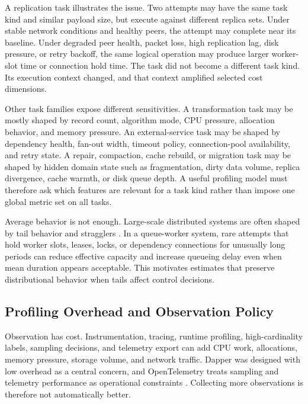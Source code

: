 A replication task illustrates the issue. Two attempts may have the same task
kind and similar payload size, but execute against different replica sets. Under
stable network conditions and healthy peers, the attempt may complete near its
baseline. Under degraded peer health, packet loss, high replication lag, disk
pressure, or retry backoff, the same logical operation may produce larger
worker-slot time or connection hold time. The task did not become a different
task kind. Its execution context changed, and that context amplified selected
cost dimensions.

Other task families expose different sensitivities. A transformation task may be
mostly shaped by record count, algorithm mode, CPU pressure, allocation behavior,
and memory pressure. An external-service task may be shaped by dependency
health, fan-out width, timeout policy, connection-pool availability, and retry
state. A repair, compaction, cache rebuild, or migration task may be shaped by
hidden domain state such as fragmentation, dirty data volume, replica divergence,
cache warmth, or disk queue depth. A useful profiling model must therefore ask
which features are relevant for a task kind rather than impose one global metric
set on all tasks.

Average behavior is not enough. Large-scale distributed systems are often shaped
by tail behavior and stragglers \cite{dean2013tail,dean2004mapreduce}. In a
queue-worker system, rare attempts that hold worker slots, leases, locks, or
dependency connections for unusually long periods can reduce effective capacity
and increase queueing delay even when mean duration appears acceptable. This
motivates estimates that preserve distributional behavior when tails affect
control decisions.

\subsection{Profiling Overhead and Observation Policy}
\label{sec:background-profiling-overhead}

Observation has cost. Instrumentation, tracing, runtime profiling,
high-cardinality labels, sampling decisions, and telemetry export can add CPU
work, allocations, memory pressure, storage volume, and network traffic. Dapper
was designed with low overhead as a central concern, and OpenTelemetry treats
sampling and telemetry performance as operational constraints
\cite{sigelman2010dapper,opentelemetrySampling,opentelemetryPerformance}.
Collecting more observations is therefore not automatically better.

